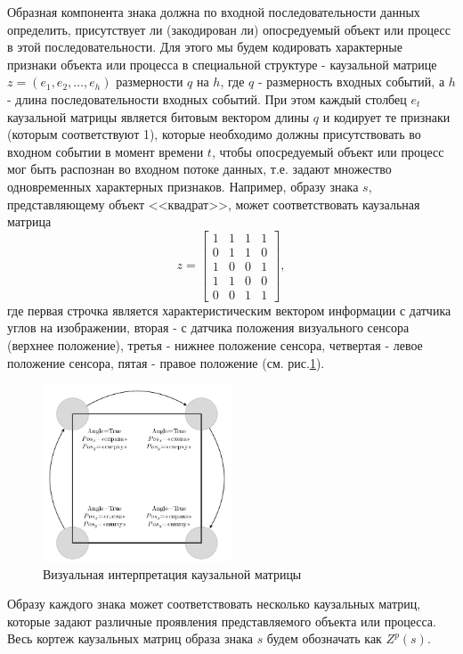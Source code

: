 \documentclass[12pt]{scrartcl}
\newcommand{\linesprval}{1}
\begin{document}
	Образная компонента знака должна по входной последовательности данных определить, присутствует ли (закодирован ли) опосредуемый объект или процесс в этой последовательности. Для этого мы будем кодировать характерные признаки объекта или процесса в специальной структуре - каузальной матрице $z=(e_1,e_2,\dots,e_h)$ размерности $q$ на $h$, где $q$ - размерность входных событий, а $h$ - длина последовательности входных событий. При этом каждый столбец $e_t$ каузальной матрицы является битовым вектором длины $q$ и кодирует те признаки (которым соответствуют 1), которые необходимо должны присутствовать во входном событии в момент времени $t$, чтобы опосредуемый объект или процесс мог быть распознан во входном потоке данных, т.е. задают множество одновременных характерных признаков. Например, образу знака $s$, представляющему объект <<квадрат>>, может соответствовать каузальная матрица 
	\[
	\renewcommand\arraystretch{0.5}
	z=\begin{bmatrix}
	1&1&1&1\\
	0&1&1&0\\
	1&0&0&1\\
	1&1&0&0\\
	0&0&1&1
	\end{bmatrix},
	\]
	\linespread{\linesprval}
	где первая строчка является характеристическим вектором информации с датчика углов на изображении, вторая - с датчика положения визуального сенсора (верхнее положение), третья - нижнее положение сенсора, четвертая - левое положение сенсора, пятая - правое положение (см. рис.\ref{fig:square}).

	\begin{figure}
		\label{fig:square}
		\centering
		\includegraphics[width=0.5\textwidth]{examples/recognition/square}
		\caption{Визуальная интерпретация каузальной матрицы}		
	\end{figure}

	Образу каждого знака может соответствовать несколько каузальных матриц, которые задают различные проявления представляемого объекта или процесса. Весь кортеж каузальных матриц образа знака $s$ будем обозначать как $Z^p(s)$. 
	
\end{document}
